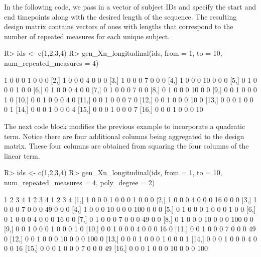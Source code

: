In the following code, we pass in a vector of 
subject IDs and specify the start and end
timepoints along with the desired length of the sequence.
The resulting design matrix contains vectors of
ones with lengths that correspond to the number of repeated
measures for each unique subject.

\begin{Schunk}
\begin{Sin}
 R> ids <- c(1,2,3,4)
 R> gen_Xn_longitudinal(ids, from = 1, to = 10, num_repeated_measures = 4)
\end{Sin}
\begin{Sout}
      [,1] [,2] [,3] [,4] [,5] [,6] [,7] [,8]
 [1,]    1    0    0    0    1    0    0    0
 [2,]    1    0    0    0    4    0    0    0
 [3,]    1    0    0    0    7    0    0    0
 [4,]    1    0    0    0   10    0    0    0
 [5,]    0    1    0    0    0    1    0    0
 [6,]    0    1    0    0    0    4    0    0
 [7,]    0    1    0    0    0    7    0    0
 [8,]    0    1    0    0    0   10    0    0
 [9,]    0    0    1    0    0    0    1    0
[10,]    0    0    1    0    0    0    4    0
[11,]    0    0    1    0    0    0    7    0
[12,]    0    0    1    0    0    0   10    0
[13,]    0    0    0    1    0    0    0    1
[14,]    0    0    0    1    0    0    0    4
[15,]    0    0    0    1    0    0    0    7
[16,]    0    0    0    1    0    0    0   10
\end{Sout}
\end{Schunk}

The next code block modifies the previous example 
to incorporate a quadratic term. Notice there are 
four additional columns being aggregated to the design matrix. 
These four columns are obtained from squaring
the four columns of the linear term. 
\begin{Schunk}
\begin{Sin}
 R> ids <- c(1,2,3,4)
 R> gen_Xn_longitudinal(ids, from = 1, to = 10, num_repeated_measures = 4, 
 poly_degree = 2)
\end{Sin}
\begin{Sout}
      1 2 3 4  1  2  3  4   1   2   3   4
 [1,] 1 0 0 0  1  0  0  0   1   0   0   0
 [2,] 1 0 0 0  4  0  0  0  16   0   0   0
 [3,] 1 0 0 0  7  0  0  0  49   0   0   0
 [4,] 1 0 0 0 10  0  0  0 100   0   0   0
 [5,] 0 1 0 0  0  1  0  0   0   1   0   0
 [6,] 0 1 0 0  0  4  0  0   0  16   0   0
 [7,] 0 1 0 0  0  7  0  0   0  49   0   0
 [8,] 0 1 0 0  0 10  0  0   0 100   0   0
 [9,] 0 0 1 0  0  0  1  0   0   0   1   0
[10,] 0 0 1 0  0  0  4  0   0   0  16   0
[11,] 0 0 1 0  0  0  7  0   0   0  49   0
[12,] 0 0 1 0  0  0 10  0   0   0 100   0
[13,] 0 0 0 1  0  0  0  1   0   0   0   1
[14,] 0 0 0 1  0  0  0  4   0   0   0  16
[15,] 0 0 0 1  0  0  0  7   0   0   0  49
[16,] 0 0 0 1  0  0  0 10   0   0   0 100
\end{Sout}
\end{Schunk}


